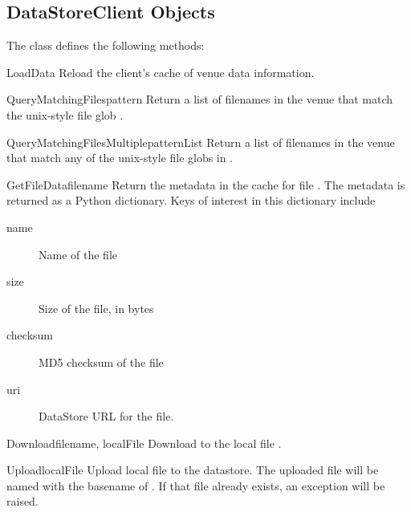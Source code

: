 \documentclass{howto}
\begin{document}
%
%


\subsection{DataStoreClient Objects}

The  class defines the following methods:

\begin{methoddesc}{LoadData}{}
Reload the client's cache of venue data information.
\end{methoddesc}

\begin{methoddesc}{QueryMatchingFiles}{pattern}
Return a list of filenames in the venue that match the unix-style file
glob .

\end{methoddesc}

\begin{methoddesc}{QueryMatchingFilesMultiple}{patternList}
Return a list of filenames in the venue that match any of the unix-style file
globs in .

\end{methoddesc}

\begin{methoddesc}{GetFileData}{filename}
Return the metadata in the cache for file . The metadata
is returned as a Python dictionary. Keys of
interest in this dictionary include 
\begin{description}
\item[name~] Name of the file
\item[size~] Size of the file, in bytes
\item[checksum~] MD5 checksum of the file
\item[uri~] DataStore URL for the file.
\end{description}

\end{methoddesc}

\begin{methoddesc}{Download}{filename, localFile}
Download  to the local file .
\end{methoddesc}

\begin{methoddesc}{Upload}{localFile}
Upload local file  to the datastore. The uploaded file will
be named with the basename of . If that file already
exists, an exception will be raised.
\end{methoddesc}
\end{document}
